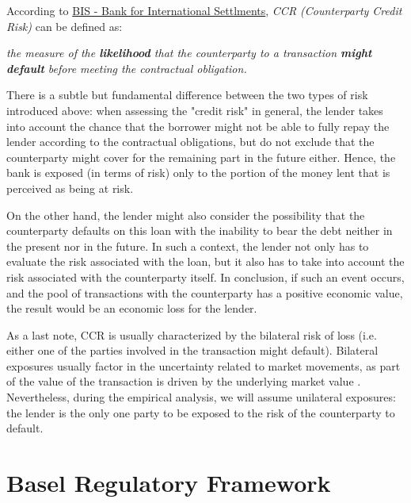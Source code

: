 \documentclass[a4paper,12pt]{article}
\begin{document}
    According to \href{https://www.bis.org/}{BIS - Bank for International Settlments}, \textit{CCR (Counterparty Credit Risk)} can be defined as:
    
        \begin{definition}
            \textit{the measure of the \textbf{likelihood} that the counterparty to a transaction \textbf{might default} before meeting the contractual obligation.} \cite{basel_CCR}
        \end{definition}

        There is a subtle but fundamental difference between the two types of risk introduced above: 
        when assessing the "credit risk" in general, the lender takes into account the chance that the 
        borrower might not be able to fully repay the lender according to the contractual obligations, 
        but do not exclude that the counterparty might cover for the remaining part in the future either. 
        Hence, the bank is exposed (in terms of risk) only to the portion of the money lent that is perceived as being at risk. 
        
        On the other hand, the lender might also consider the possibility that the counterparty defaults on this loan 
        with the inability to bear the debt neither in the present nor in the future. 
        In such a context, the lender not only has to evaluate the risk associated with the loan, 
        but it also has to take into account the risk associated with the counterparty itself. 
        In conclusion, if such an event occurs, and the pool of transactions with the counterparty has a positive economic value, 
        the result would be an economic loss for the lender. 

        As a last note, CCR is usually characterized by the bilateral risk of loss (i.e. either one of the parties involved in the transaction might default). 
        Bilateral exposures usually factor in the uncertainty related to market movements, as part of the value of the transaction is driven by the underlying market value \cite{basel_CCR}.
        Nevertheless, during the empirical analysis, we will assume unilateral exposures: 
        the lender is the only one party to be exposed to the risk of the counterparty to default.


    \pagebreak
    \section{Basel Regulatory Framework}
\end{document}
